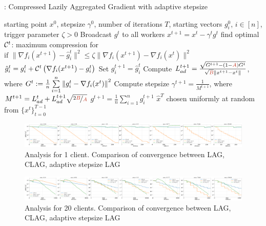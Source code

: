 \documentclass[nohyperref]{article}
\theoremstyle{plain}
\theoremstyle{definition}
\theoremstyle{remark}
\begin{document}
\begin{algorithm}[h]
   \caption*{: Compressed Lazily Aggregated Gradient with adaptive stepsize}\label{alg:clag}
\begin{algorithmic}[1]
    starting point $x^0$, stepsize $\gamma^0$, number of iterations $T$, starting vectors $g_i^0$, $i \in [n]$, trigger parameter $\zeta > 0$
   \STATE Broadcast $g^t$ to all workers
   \STATE $x^{t+1} = x^t - \gamma^t g^t$
   \STATE find optimal $\mathcal{C}^t$: maximum compression for $\text{if } \|\nabla f_i(x^{t+1}) - \hat{g}_i^t\|^2 \leq \zeta \|\nabla f_i(x^{t+1}) - \nabla f_i(x^t)\|^2$
   \STATE $\hat{g}_i^t = g_i^t + \mathcal{C}^t\left(\nabla f_i(x^{t+1}) - g_i^t\right)$
   \STATE Set $g_i^{t+1} = \hat{g}_i^t$ 
   \STATE Compute $    L^{t+1}_{ad} = \frac{\sqrt{G^{t+1} - (1-\thetaNEW)G^t}}{\sqrt{\betaNEW} \norm{x^{t+1} - x^t}}$, where $G^t := \frac{1}{n} \sum \limits_{i=1}^n \left\|  g_i^t-\nabla f_i(x^{t})  \right\|^{2}$
   \STATE Compute stepsize $\gamma^{t+1} = \frac{1}{M^{t+1}}$, where $M^{t+1} = L^{t}_{ad} + L^{t+1}_{ad}\sqrt{\nicefrac{2\betaNEW}{\thetaNEW}}$
   \ENDFOR
   \STATE $g^{t+1} = \tfrac{1}{n}\sum_{i=1}^ng_i^{t+1}$
   \ENDFOR
    $\hat x^T$ chosen uniformly at random from $\{x^t\}_{t=0}^{T-1}$
\end{algorithmic}
\end{algorithm}

\begin{figure}[!h]
	\centering
	\includegraphics[width=\textwidth]{plots/adaptive/n1.png}
	\caption{Analysis for 1 client. Comparison of convergence between LAG, CLAG, adaptive stepsize LAG}
	\label{fig:anna-100-nodes-grads_main}
\end{figure}

\begin{figure}[!h]
	\centering
	\includegraphics[width=\textwidth]{plots/adaptive/n20.png}
	\caption{Analysis for 20 clients. Comparison of convergence between LAG, CLAG, adaptive stepsize LAG}
	\label{fig:anna-100-nodes-grads_main}
\end{figure}
\end{document}
